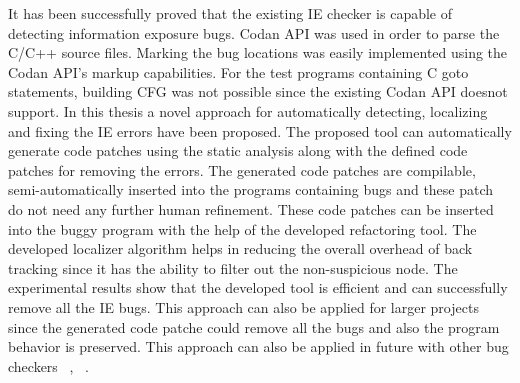 It has been successfully proved that the existing IE checker is capable of detecting
information exposure bugs. Codan API was used in order to parse the C/C++ source files.
Marking the bug locations was easily implemented using the Codan API's markup capabilities.
For the test programs containing C goto statements, building CFG was not possible since the
existing Codan API doesnot support. In this thesis a novel approach for automatically detecting, localizing and fixing the
IE errors have been proposed. The proposed tool can automatically generate code patches using the 
static analysis along with the defined code patches for removing the errors. The generated code
patches are compilable, semi-automatically inserted into the programs containing bugs and these
patch do not need any further human refinement. These code patches can be inserted into the 
buggy program with the help of the developed refactoring tool. The developed localizer algorithm
helps in reducing the overall overhead of back tracking since it has the ability to filter out 
the non-suspicious node. The experimental results show that the developed tool is efficient and can successfully remove
all the IE bugs. This approach can also be applied for larger projects since the generated
code patche could remove all the bugs and also the program behavior is preserved.
This approach can also be applied in future with other bug checkers ~\cite{ibing:path}, ~\cite{Ibing:fixed}.

